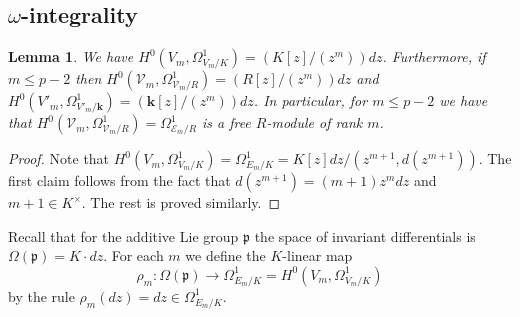 \documentclass[11pt]{amsart}
\newtheorem{lemma}[theorem]{Lemma}
\theoremstyle{remark}
\numberwithin{equation}{section}
\newcommand{\pfrak}{\mathfrak{p}}
\newcommand{\Ecal}{\mathscr{E}}
\newcommand{\Vcal}{\mathscr{V}}
\newcommand{\kk}{\mathbf{k}}
\begin{document}
\subsection{$\omega$-integrality} 
\begin{lemma}\label{LemmaDiffExpl} We have $H^0(V_m, \Omega^1_{V_m/K})=(K[z]/(z^m))dz$. Furthermore, if $m\le p-2$ then $H^0(\Vcal_m,\Omega^1_{\Vcal_m/R}) = (R[z]/(z^m))dz$ and $H^0(V'_m, \Omega^1_{V'_m/\kk})=(\kk[z]/(z^m))dz$. In particular, for $m\le p-2$ we have that $H^0(\Vcal_m,\Omega^1_{\Vcal_m/R})=\Omega^1_{\Ecal_m/R} $ is a free $R$-module of rank $m$.
\end{lemma}
\begin{proof}  Note that $H^0(V_m,\Omega^1_{V_m/K})=\Omega^1_{E_m/K}=K[z]dz/(z^{m+1}, d(z^{m+1}))$. The first claim follows from the fact that $d(z^{m+1})=(m+1)z^mdz$ and $m+1\in K^\times$. The rest is proved similarly. 
\end{proof}

Recall that for the additive Lie group $\pfrak$ the space of invariant differentials is $\Omega(\pfrak)=K\cdot dz$. For each $m$ we define the $K$-linear map 
$$
\rho_m:\Omega(\pfrak)\to \Omega^1_{E_m/K}=H^0(V_m, \Omega^1_{V_m/K})
$$ 
by the rule $\rho_m(dz)=dz\in \Omega^1_{E_m/K}$.
\end{document}
